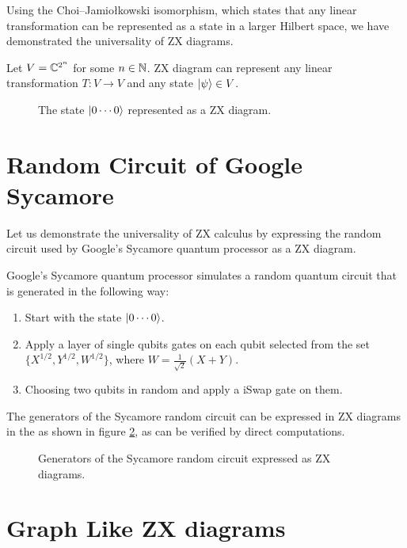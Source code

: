 Using the Choi–Jamiołkowski isomorphism, which states that any linear transformation can be represented as a state in a larger Hilbert space, we have demonstrated the universality of ZX diagrams.

\begin{theorem}
	Let $V = \mathbb{C}^{2^n}$ for some $n \in \mathbb{N}$. 
	ZX diagram can represent any linear transformation $T: V \to V$ and any state $| \psi \rangle \in V$.
\end{theorem}

\begin{figure}[ht]
	\centering
	
	\caption{The state $| 0 \cdots 0 \rangle$ represented as a ZX diagram.} 
	\label{fig:zero_state}
\end{figure}

\section{Random Circuit of Google Sycamore}

Let us demonstrate the universality of ZX calculus by expressing the random circuit used by Google's Sycamore quantum processor \cite{GoogleSycamore} as a ZX diagram.

Google's Sycamore quantum processor simulates a random quantum circuit that is generated in the following way: 
\begin{enumerate}
	\item Start with the state $| 0 \cdots 0 \rangle$.
	\item Apply a layer of single qubits gates on each qubit selected from the set $\{X^{1/2}, Y^{1/2}, W^{1/2}\}$, where $W = \frac{1}{\sqrt{2}}(X + Y)$. 
	\item Choosing two qubits in random and apply a iSwap gate on them. 
\end{enumerate}

The generators of the Sycamore random circuit can be expressed in ZX diagrams in the as shown in figure \ref{fig:sycamore_generators}, as can be verified by direct computations.

\begin{figure}[ht]
	\centering
	
	\caption{Generators of the Sycamore random circuit expressed as ZX diagrams.}
	\label{fig:sycamore_generators}
\end{figure}

\section{Graph Like ZX diagrams}

